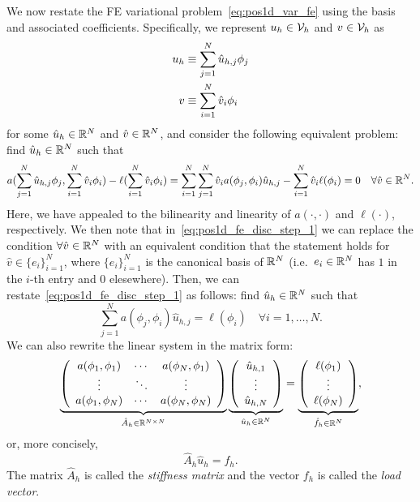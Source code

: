 We now restate the FE variational problem~\eqref{eq:pos1d_var_fe} using the basis and associated coefficients.  Specifically, we represent $u_h \in \calV_h$ and $v \in \calV_h$ as 
\begin{align}
  u_h &\equiv \sum_{j=1}^N \hat u_{h,j} \phi_j \label{eq:pos1d_uh_rep} \\
   v &\equiv \sum_{i=1}^N \hat v_i \phi_i \notag
\end{align}
for some $\hat u_h \in \RR^N$ and $\hat v \in \RR^N$, and consider the following equivalent problem: find $\hat u_h \in \RR^N$ such that
\begin{equation}
  a(\sum_{j=1}^N \hat u_{h,j} \phi_j, \sum_{i=1}^N \hat v_i \phi_i) - \ell(\sum_{i=1}^N \hat v_i \phi_i)
  =
  \sum_{i=1}^N \sum_{j=1}^N \hat v_i a(\phi_j, \phi_i) \hat u_{h,j} -
  \sum_{i=1}^N \hat v_i \ell(\phi_i) = 0 \quad \forall \hat v \in \RR^N.
  \label{eq:pos1d_fe_disc_step_1}
\end{equation}
Here, we have appealed to the bilinearity and linearity of $a(\cdot,\cdot)$ and $\ell(\cdot)$, respectively. We then note that in~\eqref{eq:pos1d_fe_disc_step_1} we can replace the condition $\forall \hat v \in \RR^N$ with an equivalent condition that the statement holds for $\hat v \in \{e_i \}_{i=1}^N$, where $\{e_i\}_{i=1}^N$ is the canonical basis of $\RR^N$ (i.e.~$e_i \in \RR^N$ has $1$ in the $i$-th entry and $0$ elesewhere). Then, we can restate~\eqref{eq:pos1d_fe_disc_step_1} as follows: find $\hat u_h \in \RR^N$ such that
\begin{equation}
  \sum_{j=1}^N a(\phi_j,\phi_i) \hat u_{h,j} = \ell(\phi_i) \quad  \forall i = 1,\dots,N.
  \label{eq:pos1d_sys}
\end{equation}
We can also rewrite the linear system in the matrix form:
\begin{equation*}
  \underbrace{ \bmat{ccc}
  a(\phi_1,\phi_1) & \cdots & a(\phi_N,\phi_1) \\
  \vdots & \ddots & \vdots \\
  a(\phi_1,\phi_N) & \cdots & a(\phi_N,\phi_N) \\
  \emat
  }_{\hat A_h \in \RR^{N \times N}}
  \underbrace{ \bmat{c} \hat u_{h,1}  \\ \vdots \\ \hat u_{h,N} \emat }_{\hat u_h \in \RR^N}
  =
  \underbrace{ \bmat{c} \ell(\phi_1) \\ \vdots \\ \ell(\phi_N) \emat }_{\hat f_h \in \RR^N},
\end{equation*}
or, more concisely,
\begin{equation*}
  \hat A_h \hat u_h = f_h.
\end{equation*}
The matrix $\hat A_h$ is called the \emph{stiffness matrix} and the vector $f_h$ is called the \emph{load vector}.%

